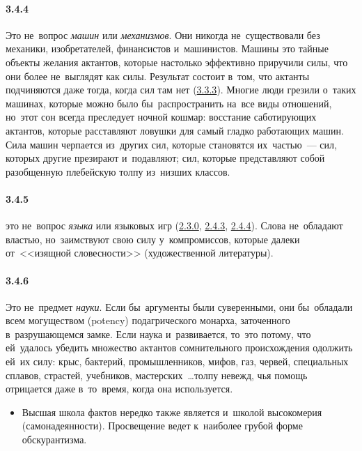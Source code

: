 \paragraph{3.4.4}\hypertarget{par:3.4.4}{} Это не~вопрос {\itshape машин} или {\itshape механизмов}. Они никогда не~существовали без механики, изобретателей, финансистов и~машинистов. Машины это тайные объекты желания актантов, которые настолько эффективно приручили силы, что они более не~выглядят как
силы. Результат состоит в~том, что актанты подчиняются даже тогда, когда сил там нет (\hyperlink{par:3.3.3}{3.3.3}).
Многие люди грезили о~таких машинах, которые можно было бы~распространить на~все виды отношений, но~этот сон всегда преследует ночной кошмар: восстание саботирующих актантов, которые расставляют ловушки для самый гладко работающих машин. Сила машин черпается из~других сил, которые становятся их~частью~--- сил, которых другие презирают и~подавляют; сил, которые представляют собой разобщенную плебейскую толпу из~низших классов.

\paragraph{3.4.5}\hypertarget{par:3.4.5}{} это не~вопрос {\itshape языка} или языковых игр (\hyperlink{par:2.3.0}{2.3.0}, \hyperlink{par:2.4.3}{2.4.3}, \hyperlink{par:2.4.4}{2.4.4}). Слова не~обладают властью, но~заимствуют свою силу у~компромиссов, которые далеки от~<<изящной словесности>> (художественной литературы).

\paragraph{3.4.6}\hypertarget{par:3.4.6}{} Это не~предмет {\itshape науки}. Если бы~аргументы были суверенными, они бы~обладали всем могуществом (potency) подагрического монарха, заточенного в~разрушающемся замке. Если наука и~развивается, то~это потому, что ей~удалось убедить множество актантов сомнительного происхождения одолжить ей~их силу: крыс, бактерий, промышленников, мифов, газ, червей, специальных сплавов, страстей, учебников, мастерских~\ldots толпу невежд, чья помощь отрицается даже в~то~время, когда она используется. 
	\begin{itemize}
	\item 
	Высшая школа фактов нередко также является и~школой высокомерия (самонадеянности). Просвещение ведет к~наиболее грубой форме обскурантизма.
	\end{itemize}

